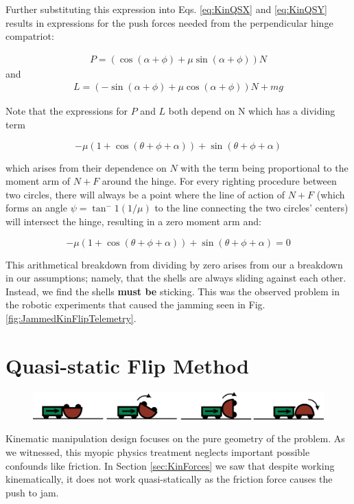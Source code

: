 \documentclass[letterpaper]{report}
\begin{document}
Further substituting this expression into Eqs. \ref{eq:KinQSX} and \ref{eq:KinQSY} results in expressions for the push forces needed from the perpendicular hinge compatriot:

\begin{align}
P = ( \cos(\alpha+\phi) + \mu \sin(\alpha+\phi) ) N
\end{align}
and
\begin{align}
L = ( -\sin(\alpha+\phi) + \mu \cos(\alpha+\phi) ) N + mg
\end{align}

Note that the expressions for $P$ and $L$ both depend on N which has a dividing term

$$-\mu (1+\cos(\theta + \phi + \alpha)) + \sin(\theta + \phi + \alpha)$$

which arises from their dependence on $N$ with the term being proportional to the moment arm of $N+F$ around the hinge.
For every righting procedure between two circles, there will always be a point where the line of action of $N+F$ (which forms an angle $\psi = \tan^-1(1/\mu)$ to the line connecting the two circles' centers) will intersect the hinge, resulting in a zero moment arm and:

$$-\mu (1+\cos(\theta + \phi + \alpha)) + \sin(\theta + \phi + \alpha) = 0$$

This arithmetical breakdown from dividing by zero arises from our a breakdown in our assumptions; namely, that the shells are always sliding against each other.
Instead, we find the shells \textbf{must be} sticking.
This was the observed problem in the robotic experiments that caused the jamming seen in Fig. \ref{fig:JammedKinFlipTelemetry}.






\chapter{Quasi-static Flip Method}
\begin{figure}[ht]
\centering
\includegraphics[width=1.0\textwidth]{QuasiStatic_CoopCartoon.png}
\end{figure}

Kinematic manipulation design focuses on the pure geometry of the problem.
As we witnessed, this myopic physics treatment neglects important possible confounds like friction.
In Section \ref{sec:KinForces} we saw that despite working kinematically, it does not work quasi-statically as the friction force causes the push to jam.
\end{document}
